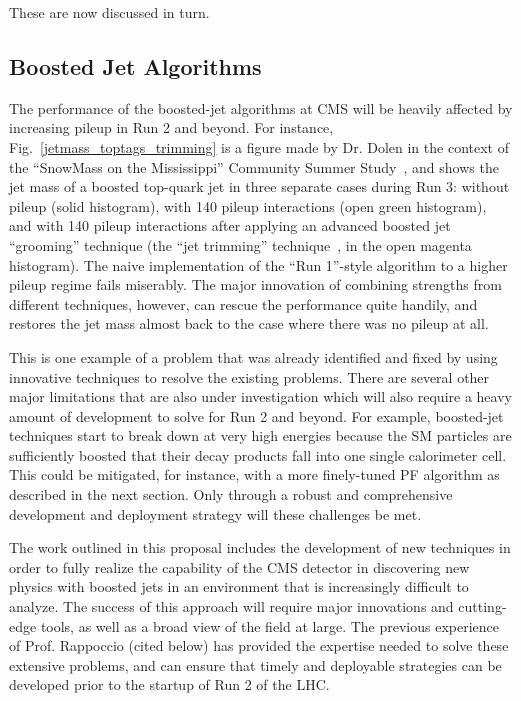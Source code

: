 \documentclass[12pt]{proposalnsf}
\begin{document}
These are now discussed in turn. 

\subsection{Boosted Jet Algorithms}

The performance of the boosted-jet algorithms at CMS will be heavily
affected by increasing pileup in Run 2 and beyond. For instance,
Fig.~\ref{jetmass_toptags_trimming} is a figure made by Dr. Dolen in
the context of the ``SnowMass on the Mississippi'' Community Summer
Study~\cite{snowmass}, and shows the jet
mass of a boosted top-quark jet in three separate cases during Run 3: 
without pileup (solid histogram), with 140 pileup
interactions (open green histogram), and with 140 pileup
interactions after applying an advanced boosted jet ``grooming''
technique (the ``jet trimming'' technique~\cite{trimming}, in the open
magenta
histogram). The naive implementation of the
``Run 1''-style
algorithm to a higher pileup regime fails miserably. The major
innovation of combining strengths from different techniques, however,
can rescue the performance quite handily, and restores the jet mass
almost back to the case where there was no pileup at all. 

This is one example of a problem that was already identified and fixed
by using innovative techniques to resolve the existing problems. There
are several other major limitations that are also under investigation
which will also require a heavy amount of development to solve for Run
2 and beyond. For example, boosted-jet techniques start to break down
at very high energies because the SM particles are sufficiently
boosted that their decay products fall into one single calorimeter
cell. This could be mitigated, for instance, with a more finely-tuned
PF algorithm as described in the next section. Only through a robust
and comprehensive development and deployment strategy will these
challenges be met. 

The work outlined in this proposal includes the development of new
techniques in order to fully realize the
capability of the CMS detector in discovering new physics with boosted
jets in an environment that is increasingly difficult to analyze. The
success of this approach
will require major innovations and cutting-edge tools, as
well as a broad view of the field at large. The
previous experience of Prof. Rappoccio (cited below) has provided the expertise
needed to solve these extensive problems, and can ensure that timely
and deployable strategies can be developed prior to the startup of Run
2 of the LHC. 
\end{document}
